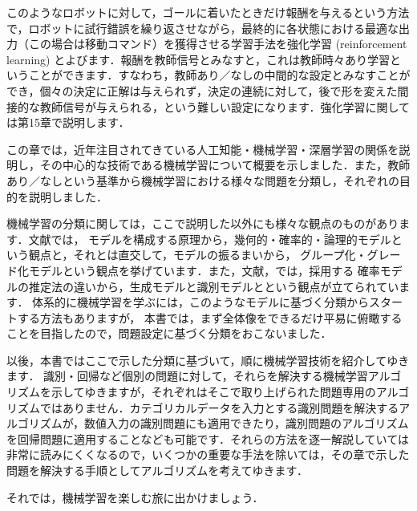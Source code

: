 このようなロボットに対して，ゴールに着いたときだけ報酬を与えるという方法で，ロボットに試行錯誤を繰り返させながら，最終的に各状態における最適な出力（この場合は移動コマンド）を獲得させる学習手法を強化学習 (reinforcement learning) とよびます．報酬を教師信号とみなすと，これは教師時々あり学習ということができます．すなわち，教師あり／なしの中間的な設定とみなすことができ，個々の決定に正解は与えられず，決定の連続に対して，後で形を変えた間接的な教師信号が与えられる，という難しい設定になります．強化学習に関しては第15章で説明します．


この章では，近年注目されてきている人工知能・機械学習・深層学習の関係を説明し，その中心的な技術である機械学習について概要を示しました．また，教師あり／なしという基準から機械学習における様々な問題を分類し，それぞれの目的を説明しました．


機械学習の分類に関しては，ここで説明した以外にも様々な観点のものがあります．文献\cite{flach12}では，
モデルを構成する原理から，幾何的・確率的・論理的モデルという観点と，それとは直交して，モデルの振るまいから，
グループ化・グレード化モデルという観点を挙げています．また，文献\cite{sugiyama09}，\cite{sugiyama13}では，採用する
確率モデルの推定法の違いから，生成モデル\cite{sugiyama09}と識別モデル\cite{sugiyama13}とという観点が立てられています．
体系的に機械学習を学ぶには，このようなモデルに基づく分類からスタートする方法もありますが，
本書では，まず全体像をできるだけ平易に俯瞰することを目指したので，問題設定に基づく分類をおこないました．


以後，本書ではここで示した分類に基づいて，順に機械学習技術を紹介してゆきます．
識別・回帰など個別の問題に対して，それらを解決する機械学習アルゴリズムを示してゆきますが，それぞれはそこで取り上げられた問題専用のアルゴリズムではありません．カテゴリカルデータを入力とする識別問題を解決するアルゴリズムが，数値入力の識別問題にも適用できたり，識別問題のアルゴリズムを回帰問題に適用することなども可能です．それらの方法を逐一解説していては非常に読みにくくなるので，いくつかの重要な手法を除いては，その章で示した問題を解決する手順としてアルゴリズムを考えてゆきます．

それでは，機械学習を楽しむ旅に出かけましょう．

